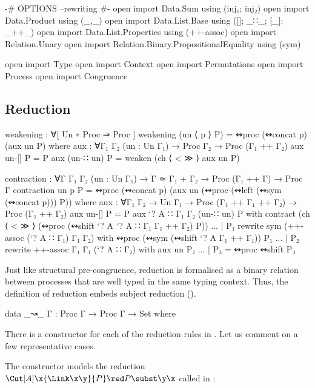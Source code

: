 \begin{code}[hide]
{-# OPTIONS --rewriting #-}
open import Data.Sum using (inj₁; inj₂)
open import Data.Product using (_,_)
open import Data.List.Base using ([]; _∷_; [_]; _++_)
open import Data.List.Properties using (++-assoc)
open import Relation.Unary
open import Relation.Binary.PropositionalEquality using (sym)

open import Type
open import Context
open import Permutations
open import Process
open import Congruence
\end{code}

\subsection{Reduction}
\label{sec:reduction-agda}

\begin{code}[hide]
weakening : ∀[ Un ∗ Proc ⇒ Proc ]
weakening (un ⟨ p ⟩ P) = ↭proc (↭concat p) (aux un P)
  where
    aux : ∀{Γ₁ Γ₂} (un : Un Γ₁) → Proc Γ₂ → Proc (Γ₁ ++ Γ₂)
    aux un-[] P = P
    aux (un-∷ un) P = weaken (ch ⟨ < ≫ ⟩ aux un P)

contraction : ∀{Γ Γ₁ Γ₂} (un : Un Γ₁) → Γ ≃ Γ₁ + Γ₂ → Proc (Γ₁ ++ Γ) → Proc Γ
contraction un p P = ↭proc (↭concat p) (aux un (↭proc (↭left (↭sym (↭concat p))) P))
  where
    aux : ∀{Γ₁ Γ₂} → Un Γ₁ → Proc (Γ₁ ++ Γ₁ ++ Γ₂) → Proc (Γ₁ ++ Γ₂)
    aux un-[] P = P
    aux {`? A ∷ Γ₁} {Γ₂} (un-∷ un) P with contract (ch ⟨ < ≫ ⟩ (↭proc (↭shift {`? A} {`? A ∷ Γ₁} {Γ₁ ++ Γ₂}) P))
    ... | P₁ rewrite sym (++-assoc (`? A ∷ Γ₁) Γ₁ Γ₂) with ↭proc (↭sym (↭shift {`? A} {Γ₁ ++ Γ₁})) P₁
    ... | P₂ rewrite ++-assoc Γ₁ Γ₁ (`? A ∷ Γ₂) with aux un P₂
    ... | P₃ = ↭proc ↭shift P₃
\end{code}

Just like structural pre-congruence, reduction is formalised as a binary
relation between processes that are well typed in the same typing context. Thus,
the definition of reduction embeds subject reduction ().

\begin{code}
data _↝_ {Γ} : Proc Γ → Proc Γ → Set where
\end{code}

There is a constructor for each of the reduction rules in .
Let us comment on a few representative cases.

The constructor  models the reduction
$\Cut[A]\x{\Link\x\y}{P} \red P\subst\y\x$ called \RLink in
:

